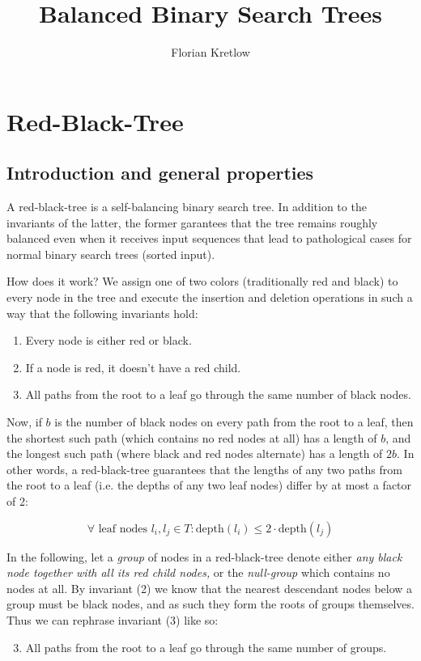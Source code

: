 \documentclass{article}
\title{Balanced Binary Search Trees}
\author{Florian Kretlow}
\begin{document}
\section{Red-Black-Tree}

\subsection{Introduction and general properties}
A red-black-tree is a self-balancing binary search tree. In addition to the invariants
of the latter, the former garantees that the tree remains roughly balanced even when it
receives input sequences that lead to pathological cases for normal binary search trees
(sorted input).

How does it work? We assign one of two colors (traditionally red and black) to every
node in the tree and execute the insertion and deletion operations in such a way that the
following invariants hold:

\begin{enumerate}[label=(\arabic*)]
\item Every node is either red or black.
\item If a node is red, it doesn't have a red child.
\item All paths from the root to a leaf go through the same number of black nodes.
\end{enumerate}

Now, if \(b\) is the number of black nodes on every path from the root to a leaf, then
the shortest such path (which contains no red nodes at all) has a length of \(b\), and
the longest such path (where black and red nodes alternate) has a length of
\(2b\). In other words, a red-black-tree guarantees that the lengths of any two paths
from the root to a leaf (i.e. the depths of any two leaf nodes) differ by at most a
factor of 2:

\[
\forall \text{ leaf nodes } l_{i}, l_{j} \in T : \text{depth}(l_i) \leq 2 \cdot
\text{depth}(l_j)
\]

In the following, let a \emph{group} of nodes in a red-black-tree denote either \emph{any
black node together with all its red child nodes,} or the \emph{null-group} which
contains no nodes at all.  By invariant (2) we know that the nearest descendant nodes
below a group must be black nodes, and as such they form the roots of groups themselves.
Thus we can rephrase invariant (3) like so:

\begin{enumerate}[label=(\arabic*)]
\setcounter{enumi}{2}
\item All paths from the root to a leaf go through the same number of groups.
\end{enumerate}
\end{document}
